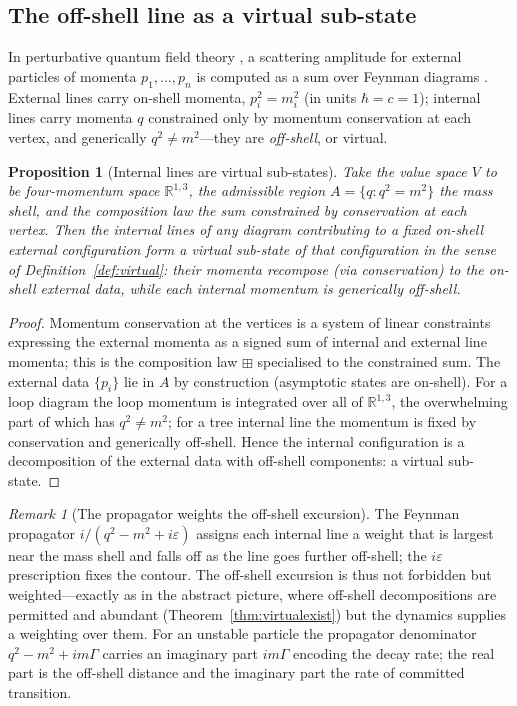 \documentclass[11pt,a4paper]{article}
\theoremstyle{thmstyle}
\newtheorem{proposition}[theorem]{Proposition}
\theoremstyle{definition}
\theoremstyle{remark}
\newtheorem{remark}[theorem]{Remark}
\newcommand{\R}{\mathbb{R}}
\newcommand{\eps}{\varepsilon}
\begin{document}
\subsection{The off-shell line as a virtual sub-state}
\label{sec:offshell}

In perturbative quantum field theory \citep{peskin1995,weinberg1995,%
itzykson1980}, a scattering amplitude for external particles of momenta
$p_1,\dots,p_n$ is computed as a sum over Feynman diagrams
\citep{feynman1949,dyson1949}. External lines carry on-shell momenta,
$p_i^2=m_i^2$ (in units $\hbar=c=1$); internal lines carry momenta $q$
constrained only by momentum conservation at each vertex, and generically
$q^2\neq m^2$---they are \emph{off-shell}, or virtual.

\begin{proposition}[Internal lines are virtual sub-states]
\label{prop:internalvirtual}
Take the value space $V$ to be four-momentum space $\R^{1,3}$, the
admissible region $A=\{q:q^2=m^2\}$ the mass shell, and the composition law
the sum constrained by conservation at each vertex. Then the internal
lines of any diagram contributing to a fixed on-shell external
configuration form a virtual sub-state of that configuration in the sense
of Definition~\ref{def:virtual}: their momenta recompose (via conservation)
to the on-shell external data, while each internal momentum is generically
off-shell.
\end{proposition}

\begin{proof}
Momentum conservation at the vertices is a system of linear constraints
expressing the external momenta as a signed sum of internal and external
line momenta; this is the composition law $\boxplus$ specialised to the
constrained sum. The external data $\{p_i\}$ lie in $A$ by construction
(asymptotic states are on-shell). For a loop diagram the loop momentum is
integrated over all of $\R^{1,3}$, the overwhelming part of which has
$q^2\neq m^2$; for a tree internal line the momentum is fixed by
conservation and generically off-shell. Hence the internal configuration
is a decomposition of the external data with off-shell components: a
virtual sub-state.
\end{proof}

\begin{remark}[The propagator weights the off-shell excursion]
\label{rem:propagator}
The Feynman propagator $i/(q^2-m^2+i\eps)$ assigns each internal line a
weight that is largest near the mass shell and falls off as the line goes
further off-shell; the $i\eps$ prescription fixes the contour. The
off-shell excursion is thus not forbidden but weighted---exactly as in the
abstract picture, where off-shell decompositions are permitted and
abundant (Theorem~\ref{thm:virtualexist}) but the dynamics supplies a
weighting over them. For an unstable particle the propagator denominator
$q^2-m^2+im\Gamma$ carries an imaginary part $im\Gamma$ encoding the decay
rate; the real part is the off-shell distance and the imaginary part the
rate of committed transition.
\end{remark}
\end{document}
